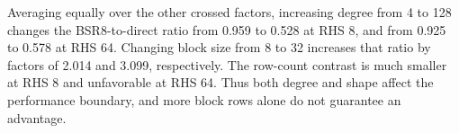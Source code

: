Averaging equally over the other crossed factors, increasing degree from 4 to 128 changes the BSR8-to-direct ratio from 0.959 to 0.528 at RHS 8, and from 0.925 to 0.578 at RHS 64. Changing block size from 8 to 32 increases that ratio by factors of 2.014 and 3.099, respectively. The row-count contrast is much smaller at RHS 8 and unfavorable at RHS 64. Thus both degree and shape affect the performance boundary, and more block rows alone do not guarantee an advantage.
